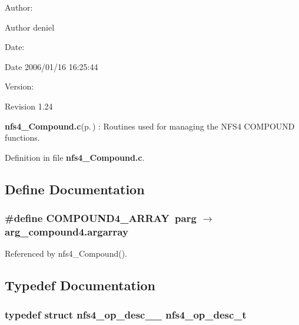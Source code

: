 \begin{Desc}
\item[Author:]\begin{Desc}
\item[Author]deniel \end{Desc}
\end{Desc}
\begin{Desc}
\item[Date:]\begin{Desc}
\item[Date]2006/01/16 16:25:44 \end{Desc}
\end{Desc}
\begin{Desc}
\item[Version:]\begin{Desc}
\item[Revision]1.24 \end{Desc}
\end{Desc}
{\bf nfs4\_\-Compound.c}{\rm (p.\,\pageref{nfs4__Compound_8c})} : Routines used for managing the NFS4 COMPOUND functions.

Definition in file {\bf nfs4\_\-Compound.c}.

\subsection{Define Documentation}
\subsubsection{\setlength{\rightskip}{0pt plus 5cm}\#define COMPOUND4\_\-ARRAY\ parg $\rightarrow$ arg\_\-compound4.argarray}\label{nfs4__Compound_8c_a0}




Referenced by nfs4\_\-Compound().

\subsection{Typedef Documentation}
\subsubsection{\setlength{\rightskip}{0pt plus 5cm}typedef struct {\bf nfs4\_\-op\_\-desc\_\-\_\-}  {\bf nfs4\_\-op\_\-desc\_\-t}}\label{nfs4__Compound_8c_a1}





